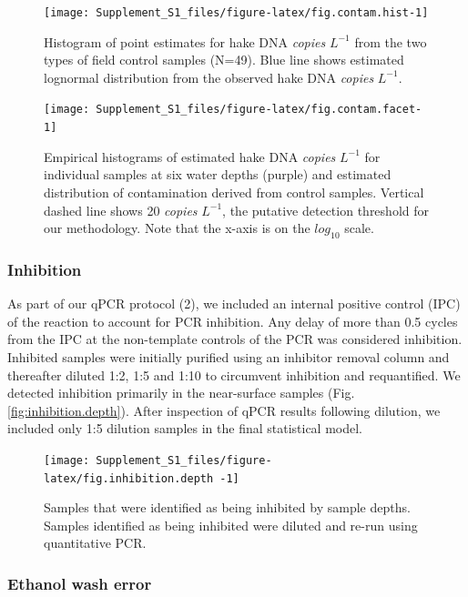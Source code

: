 \documentclass[
]{article}
\begin{document}
\begin{figure}
\texttt{[image: Supplement\_S1\_files/figure-latex/fig.contam.hist-1]} \caption{\label{fig:contam.hist} Histogram of point estimates for hake DNA \emph{copies} \(L^{-1}\) from the two types of field control samples (N=49).  Blue line shows estimated lognormal distribution from the observed hake DNA \emph{copies} \(L^{-1}\).}\label{fig:fig.contam.hist}
\end{figure}

\begin{figure}
\texttt{[image: Supplement\_S1\_files/figure-latex/fig.contam.facet-1]} \caption{\label{fig:contam.facet} Empirical histograms of estimated hake DNA \emph{copies} \(L^{-1}\) for individual samples at six water depths (purple) and estimated distribution of contamination derived from control samples. Vertical dashed line shows 20 \emph{copies} \(L^{-1}\), the putative detection threshold for our methodology. Note that the x-axis is on the \(log_{10}\) scale.}\label{fig:fig.contam.facet}
\end{figure}

\hypertarget{inhibition}{%
\subsubsection{Inhibition}\label{inhibition}}

As part of our qPCR protocol (2), we included an internal positive
control (IPC) of the reaction to account for PCR inhibition. Any delay
of more than 0.5 cycles from the IPC at the non-template controls of the
PCR was considered inhibition. Inhibited samples were initially purified
using an inhibitor removal column and thereafter diluted 1:2, 1:5 and
1:10 to circumvent inhibition and requantified. We detected inhibition
primarily in the near-surface samples (Fig. \ref{fig:inhibition.depth}).
After inspection of qPCR results following dilution, we included only
1:5 dilution samples in the final statistical model.

\begin{figure}
\texttt{[image: Supplement\_S1\_files/figure-latex/fig.inhibition.depth -1]} \caption{\label{fig:inhibition.depth} Samples that were identified as being inhibited by sample depths.  Samples identified as being inhibited were diluted and re-run using quantitative PCR. }\label{fig:fig.inhibition.depth }
\end{figure}

\hypertarget{ethanol-wash-error}{%
\subsubsection{Ethanol wash error}\label{ethanol-wash-error}}
\end{document}
